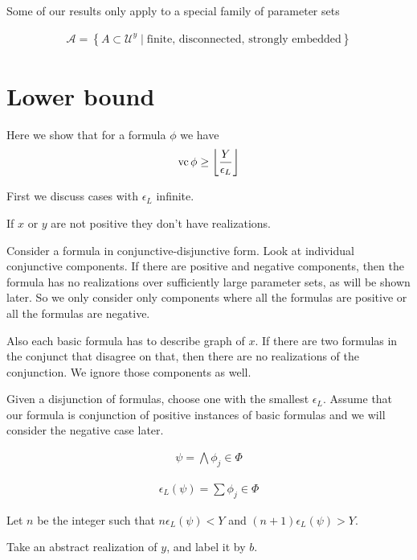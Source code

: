 \documentclass{amsart}
\renewcommand{\AA}{\mathscr A}
\newcommand{\U}{\mathcal U}
\newcommand{\curly}[1]{\left\{#1\right\}}
\providecommand{\floor}[1]{\left \lfloor #1 \right \rfloor }
\begin{document}
Some of our results only apply to a special family of parameter sets
\begin{Definition}
	\begin{align*}
		\AA = \curly{A \subset \U^{y} \mid \text{finite, disconnected, strongly embedded}}
	\end{align*}
\end{Definition}

\section{Lower bound}

Here we show that for a formula $\phi$ we have 
\begin{align*}
	\vc \phi \geq \floor{\frac{Y}{\epsilon_L}}
\end{align*}

First we discuss cases with $\epsilon_L$ infinite.

If $x$ or $y$ are not positive they don't have realizations.

Consider a formula in conjunctive-disjunctive form. Look at individual conjunctive components. If there are positive and negative components, then the formula has no realizations over sufficiently large parameter sets, as will be shown later. So we only consider only components where all the formulas are positive or all the formulas are negative.

Also each basic formula has to describe graph of $x$.
If there are two formulas in the conjunct that disagree on that, then there are no realizations of the conjunction.
We ignore those components as well. 

Given a disjunction of formulas, choose one with the smallest $\epsilon_L$.
Assume that our formula is conjunction of positive instances of basic formulas and we will consider the negative case later.

\begin{align*}
	\psi = \bigwedge \phi_j \in \Phi
\end{align*}

\begin{align*}
	\epsilon_L(\psi) = \sum \phi_j \in \Phi
\end{align*}

Let $n$ be the integer such that $n \epsilon_L(\psi) < Y$ and $(n+1) \epsilon_L(\psi) > Y$.

Take an abstract realization of $y$, and label it by $b$.
\end{document}
